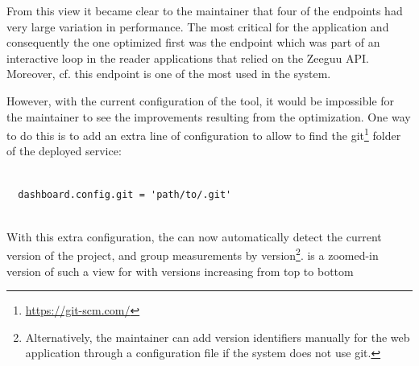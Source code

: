 \documentclass{sig-alternate-05-2015}
\begin{document}


  From this view it became clear to the maintainer that four of the endpoints had very large variation in performance.   The most critical for the application and consequently the one optimized first was the \epTranslations endpoint which was part of an interactive loop in the reader applications that relied on the Zeeguu API. Moreover, cf.  this endpoint is one of the most used in the system.


  \niceseparator


  However, with the current configuration of the tool, it would be impossible for the maintainer to see the improvements resulting from the optimization. One way to do this is to add an extra line of configuration to allow \tool to find the git\footnote{\url{https://git-scm.com/}} folder of the deployed service: 

%
%
%
    
    \begin{lstlisting}[style=custompython]
  
  dashboard.config.git = 'path/to/.git'
    
  \end{lstlisting}  
 
  With this extra configuration, the \tool can now automatically detect the current version of the project, and group measurements by version\footnote{Alternatively, the maintainer can add version identifiers manually for the web application through a configuration file if the system does not use git.}.  is a zoomed-in version of such a view for \epTranslations with versions increasing from top to bottom
  
\end{document}
